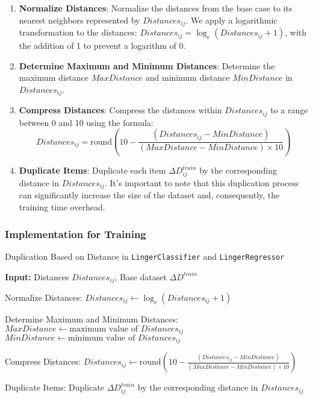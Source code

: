 \documentclass[a4paper, 12pt]{report}
\begin{document}
\begin{enumerate}
    \item \textbf{Normalize Distances}: Normalize the distances from the base case to its nearest neighbors represented by $Distances_{ij}$. 
    We apply a logarithmic transformation to the distances: $Distances_{ij} = \log_e(Distances_{ij} + 1)$, with the addition of 1 to prevent a logarithm of 0.
    
    \item \textbf{Determine Maximum and Minimum Distances}: Determine the maximum distance $MaxDistance$ and minimum distance $MinDistance$ in $Distances_{ij}$.
    
    \item \textbf{Compress Distances}: Compress the distances within $Distances_{ij}$ to a range between 0 and 10 using the formula:
    \[
        Distances_{ij} = \text{round}\left(10 - \frac{(Distances_{ij} - MinDistance)}{(MaxDistance - MinDistance) \times 10}\right)
    \]
    
    \item \textbf{Duplicate Items}: Duplicate each item $\Delta D^{train}_{ij}$ by the corresponding distance in $Distances_{ij}$. 
    It's important to note that this duplication process can significantly increase the size of the dataset and, consequently, the training time overhead.
\end{enumerate}

\subsubsection{Implementation for Training}
\begin{algorithm}[H]
    \caption{Duplication Based on Distance in \texttt{LingerClassifier} and \texttt{LingerRegressor}}
    \label{alg:duplication_based_on_distance_train}
    \textbf{Input:} Distances $Distances_{ij}$, Base dataset $\Delta D^{train}$
    \begin{algorithmic}[1]
        \State Normalize Distances:
            \State $Distances_{ij} \gets \log_e(Distances_{ij} + 1)$ 
        \EndFor

        \State Determine Maximum and Minimum Distances:
        \State $MaxDistance \gets \text{maximum value of } Distances_{ij}$
        \State $MinDistance \gets \text{minimum value of } Distances_{ij}$

        \State Compress Distances:
            \State $Distances_{ij} \gets \text{round}\left(10 - \frac{(Distances_{ij} - MinDistance)}{(MaxDistance - MinDistance) \times 10}\right)$
        \EndFor

        \State Duplicate Items:
            \State Duplicate $\Delta D^{train}_{ij}$ by the corresponding distance in $Distances_{ij}$
        \EndFor
    \end{algorithmic}
\end{algorithm}
\end{document}
